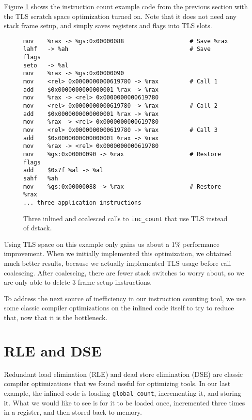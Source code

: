 Figure \ref{fig:inscount_tls} shows the instruction count example code from the
previous section with the TLS scratch space optimization turned on.  Note that
it does not need any stack frame setup, and simply saves registers and flags
into TLS slots.

\begin{figure}
\begin{verbatim}
mov    %rax -> %gs:0x00000088                   # Save %rax
lahf   -> %ah                                   # Save flags
seto   -> %al 
mov    %rax -> %gs:0x00000090 
mov    <rel> 0x0000000000619780 -> %rax         # Call 1
add    $0x0000000000000001 %rax -> %rax 
mov    %rax -> <rel> 0x0000000000619780 
mov    <rel> 0x0000000000619780 -> %rax         # Call 2
add    $0x0000000000000001 %rax -> %rax 
mov    %rax -> <rel> 0x0000000000619780 
mov    <rel> 0x0000000000619780 -> %rax         # Call 3
add    $0x0000000000000001 %rax -> %rax 
mov    %rax -> <rel> 0x0000000000619780 
mov    %gs:0x00000090 -> %rax                   # Restore flags
add    $0x7f %al -> %al 
sahf   %ah 
mov    %gs:0x00000088 -> %rax                   # Restore %rax
... three application instructions
\end{verbatim}
\caption{Three inlined and coalesced calls to {\tt inc\_count} that use TLS
instead of dstack.}
\label{fig:inscount_tls}
\end{figure}

Using TLS space on this example only gains us about a 1\% performance
improvement.  When we initially implemented this optimization, we obtained much
better results, because we actually implemented TLS usage before call
coalescing.  After coalescing, there are fewer stack switches to worry about,
so we are only able to delete 3 frame setup instructions.

To address the next source of inefficiency in our instruction counting tool, we
use some classic compiler optimizations on the inlined code itself to try to
reduce that, now that it is the bottleneck.

\section{RLE and DSE}

Redundant load elimination (RLE) and dead store elimination (DSE) are classic
compiler optimizations that we found useful for optimizing tools.  In our last
example, the inlined code is loading {\tt global\_count}, incrementing it, and
storing it.  What we would like to see is for it to be loaded once, incremented
three times in a register, and then stored back to memory.


